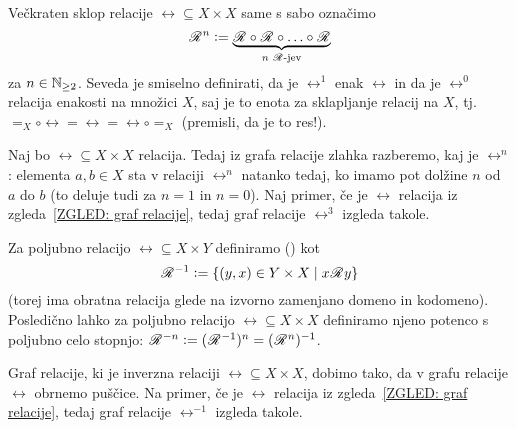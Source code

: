 		Večkraten sklop relacije $\rel \subseteq X \times X$ same s sabo označimo
		\[\rel^n \dfeq \underbrace{\rel \circ \rel \circ \ldots \circ \rel}_{\text{$n$ $\rel$-jev}}\]
		za $n \in \mathbb{N}_{\geq 2}$. Seveda je smiselno definirati, da je $\rel^1$ enak $\rel$ in da je $\rel^0$ relacija enakosti na množici $X$, saj je to enota za sklapljanje relacij na $X$, tj.~$=_X \circ \rel = \rel = \rel \circ =_X$ (premisli, da je to res!).
		
		\begin{zgled}
			Naj bo $\rel \subseteq X \times X$ relacija. Tedaj iz grafa relacije zlahka razberemo, kaj je $\rel^n$: elementa $a, b \in X$ sta v relaciji $\rel^n$ natanko tedaj, ko imamo pot dolžine $n$ od $a$ do $b$ (to deluje tudi za $n = 1$ in $n = 0$). Naj primer, če je $\rel$ relacija iz zgleda~\ref{ZGLED: graf relacije}, tedaj graf relacije $\rel^3$ izgleda takole.
			
		\end{zgled}
		
		Za poljubno relacijo $\rel \subseteq X \times Y$ definiramo  () \df{relacijo} kot
		\[\rel^{-1} \dfeq \set{(y, x) \in Y \times X}{x \rel y}\]
		(torej ima obratna relacija glede na izvorno zamenjano domeno in kodomeno). Posledično lahko za poljubno relacijo $\rel \subseteq X \times X$ definiramo njeno potenco s poljubno celo stopnjo: $\:\!{\mathscr{R}}\:\!^{-n} \mathrel{\mathop:}= (\:\!{\mathscr{R}}\:\!^{-1})^n = (\:\!{\mathscr{R}}\:\!^n)^{-1}$.
		
		\begin{zgled}
			Graf relacije, ki je inverzna relaciji $\rel \subseteq X \times X$, dobimo tako, da v grafu relacije $\rel$ obrnemo puščice. Na primer, če je $\rel$ relacija iz zgleda~\ref{ZGLED: graf relacije}, tedaj graf relacije $\rel^{-1}$ izgleda takole.
			
			\note{graf $\rel^{-1}$}
		\end{zgled}
		
